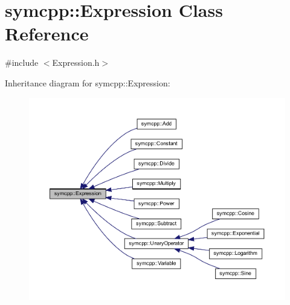 \hypertarget{classsymcpp_1_1Expression}{}\section{symcpp\+::Expression Class Reference}
\label{classsymcpp_1_1Expression}


{\ttfamily \#include $<$Expression.\+h$>$}



Inheritance diagram for symcpp\+::Expression\+:
\nopagebreak
\begin{figure}[H]
\begin{center}
\leavevmode
\includegraphics[width=350pt]{classsymcpp_1_1Expression__inherit__graph}
\end{center}
\end{figure}
